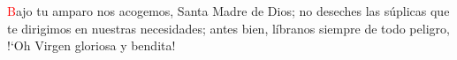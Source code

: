 \textcolor{red}{B}ajo tu amparo nos acogemos, Santa Madre de Dios; no deseches las súplicas que te dirigimos en nuestras necesidades;
antes bien, líbranos siempre de todo peligro, {!`}Oh Virgen gloriosa y bendita!